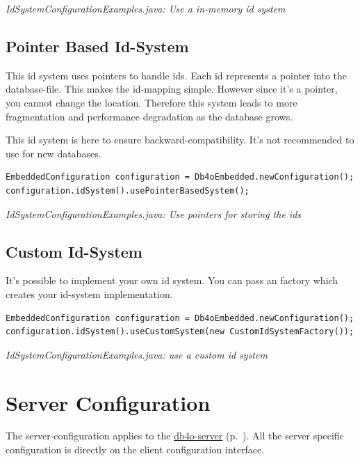 {\small\itshape IdSystemConfigurationExamples.java: Use a in-memory id system\par}
\medskip

\subsection*{Pointer Based Id-System}

This id system uses pointers to handle ids. Each id represents a pointer into the database-file. This makes the id-mapping simple. However since it's a pointer, you cannot change the location. Therefore this system leads to more fragmentation and performance degradation as the database grows.

This id system is here to ensure backward-compatibility. It's not recommended to use for new databases.

\begin{lstlisting}
EmbeddedConfiguration configuration = Db4oEmbedded.newConfiguration();
configuration.idSystem().usePointerBasedSystem();
\end{lstlisting}

{\small\itshape IdSystemConfigurationExamples.java: Use pointers for storing the ids\par}
\medskip

\subsection*{Custom Id-System}

It's possible to implement your own id system. You can pass an factory which creates your id-system implementation.

\begin{lstlisting}
EmbeddedConfiguration configuration = Db4oEmbedded.newConfiguration();
configuration.idSystem().useCustomSystem(new CustomIdSystemFactory());
\end{lstlisting}

{\small\itshape IdSystemConfigurationExamples.java: use a custom id system\par}
\medskip

\section{Server Configuration}
\label{ref:configuration-server-configuration}

The server-configuration applies to the \hyperref[ref:client-server]{db4o-server} (p.~\pageref{ref:client-server}). All the server specific configuration is directly on the client configuration interface.

